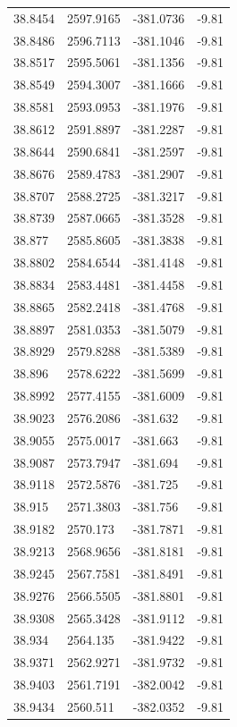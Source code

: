 \begin{table}[H]
\begin{tabular}{llll}
38.8454 & 2597.9165 & -381.0736 & -9.81 \\
38.8486 & 2596.7113 & -381.1046 & -9.81 \\
38.8517 & 2595.5061 & -381.1356 & -9.81 \\
38.8549 & 2594.3007 & -381.1666 & -9.81 \\
38.8581 & 2593.0953 & -381.1976 & -9.81 \\
38.8612 & 2591.8897 & -381.2287 & -9.81 \\
38.8644 & 2590.6841 & -381.2597 & -9.81 \\
38.8676 & 2589.4783 & -381.2907 & -9.81 \\
38.8707 & 2588.2725 & -381.3217 & -9.81 \\
38.8739 & 2587.0665 & -381.3528 & -9.81 \\
38.877 & 2585.8605 & -381.3838 & -9.81 \\
38.8802 & 2584.6544 & -381.4148 & -9.81 \\
38.8834 & 2583.4481 & -381.4458 & -9.81 \\
38.8865 & 2582.2418 & -381.4768 & -9.81 \\
38.8897 & 2581.0353 & -381.5079 & -9.81 \\
38.8929 & 2579.8288 & -381.5389 & -9.81 \\
38.896 & 2578.6222 & -381.5699 & -9.81 \\
38.8992 & 2577.4155 & -381.6009 & -9.81 \\
38.9023 & 2576.2086 & -381.632 & -9.81 \\
38.9055 & 2575.0017 & -381.663 & -9.81 \\
38.9087 & 2573.7947 & -381.694 & -9.81 \\
38.9118 & 2572.5876 & -381.725 & -9.81 \\
38.915 & 2571.3803 & -381.756 & -9.81 \\
38.9182 & 2570.173 & -381.7871 & -9.81 \\
38.9213 & 2568.9656 & -381.8181 & -9.81 \\
38.9245 & 2567.7581 & -381.8491 & -9.81 \\
38.9276 & 2566.5505 & -381.8801 & -9.81 \\
38.9308 & 2565.3428 & -381.9112 & -9.81 \\
38.934 & 2564.135 & -381.9422 & -9.81 \\
38.9371 & 2562.9271 & -381.9732 & -9.81 \\
38.9403 & 2561.7191 & -382.0042 & -9.81 \\
38.9434 & 2560.511 & -382.0352 & -9.81 \\

\end{tabular}
\end{table}
